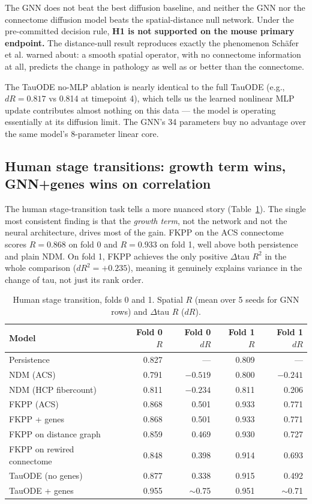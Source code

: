 \documentclass{article}
\begin{document}
The GNN does not beat the best diffusion baseline, and neither the GNN nor the connectome diffusion model beats the spatial-distance null network. Under the pre-committed decision rule, \textbf{H1 is not supported on the mouse primary endpoint.} The distance-null result reproduces exactly the phenomenon Sch\"afer et al. warned about: a smooth spatial operator, with no connectome information at all, predicts the change in pathology as well as or better than the connectome.

The TauODE no-MLP ablation is nearly identical to the full TauODE (e.g., $dR = 0.817$ vs 0.814 at timepoint 4), which tells us the learned nonlinear MLP update contributes almost nothing on this data --- the model is operating essentially at its diffusion limit. The GNN's 34 parameters buy no advantage over the same model's 8-parameter linear core.

\subsection{Human stage transitions: growth term wins, GNN+genes wins on correlation}

The human stage-transition task tells a more nuanced story (Table~\ref{tab:human_stage}). The single most consistent finding is that the \textit{growth term}, not the network and not the neural architecture, drives most of the gain. FKPP on the ACS connectome scores $R = 0.868$ on fold 0 and $R = 0.933$ on fold 1, well above both persistence and plain NDM. On fold 1, FKPP achieves the only positive $\Delta$tau $R^2$ in the whole comparison ($dR^2 = +0.235$), meaning it genuinely explains variance in the change of tau, not just its rank order.

\begin{table}[t]
  \caption{Human stage transition, folds 0 and 1. Spatial $R$ (mean over 5 seeds for GNN rows) and $\Delta$tau $R$ ($dR$).}
  \label{tab:human_stage}
  \centering
  \begin{tabular}{lrrrr}
    \toprule
    Model & Fold 0 $R$ & Fold 0 $dR$ & Fold 1 $R$ & Fold 1 $dR$ \\
    \midrule
    Persistence               & 0.827 & ---      & 0.809 & --- \\
    NDM (ACS)                  & 0.791 & $-0.519$ & 0.800 & $-0.241$ \\
    NDM (HCP fibercount)       & 0.811 & $-0.234$ & 0.811 & 0.206 \\
    FKPP (ACS)                 & 0.868 & 0.501    & 0.933 & 0.771 \\
    FKPP + genes               & 0.868 & 0.501    & 0.933 & 0.771 \\
    FKPP on distance graph     & 0.859 & 0.469    & 0.930 & 0.727 \\
    FKPP on rewired connectome & 0.848 & 0.398    & 0.914 & 0.693 \\
    TauODE (no genes)          & 0.877 & 0.338    & 0.915 & 0.492 \\
    TauODE + genes             & 0.955 & $\sim$0.75 & 0.951 & $\sim$0.71 \\
    \bottomrule
  \end{tabular}
\end{table}
\end{document}
